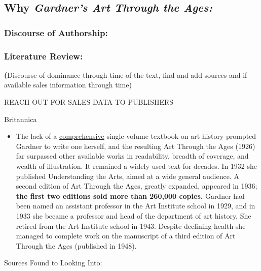 \documentclass[
  letterpaper,
  DIV=11,
  numbers=noendperiod]{scrreprt}
\providecommand{\tightlist}{%
  \setlength{\itemsep}{0pt}\setlength{\parskip}{0pt}}
\begin{document}
\hypertarget{why-gardners-art-through-the-ages}{%
\subsection{\texorpdfstring{Why \emph{Gardner's Art Through the
Ages:}}{Why Gardner's Art Through the Ages:}}\label{why-gardners-art-through-the-ages}}

\hypertarget{discourse-of-authorship}{%
\subsubsection{Discourse of Authorship:}\label{discourse-of-authorship}}

\hypertarget{literature-review}{%
\subsubsection{Literature Review:}\label{literature-review}}

\textbf{(}Discourse of dominance through time of the text, find and add
sources and if available sales information through time)

REACH OUT FOR SALES DATA TO PUBLISHERS

Britannica

\begin{itemize}
\tightlist
\item
  The lack of a
  \href{https://www.merriam-webster.com/dictionary/comprehensive}{comprehensive}
  single-volume textbook on art history prompted Gardner to write one
  herself, and the resulting Art Through the Ages (1926) far surpassed
  other available works in readability, breadth of coverage, and wealth
  of illustration. It remained a widely used text for decades. In 1932
  she published Understanding the Arts, aimed at a wide general
  audience. A second edition of Art Through the Ages, greatly expanded,
  appeared in 1936; \textbf{the first two editions sold more than
  260,000 copies.} Gardner had been named an assistant professor in the
  Art Institute school in 1929, and in 1933 she became a professor and
  head of the department of art history. She retired from the Art
  Institute school in 1943. Despite declining health she managed to
  complete work on the manuscript of a third edition of Art Through the
  Ages (published in 1948).
\end{itemize}

Sources Found to Looking Into:
\end{document}

